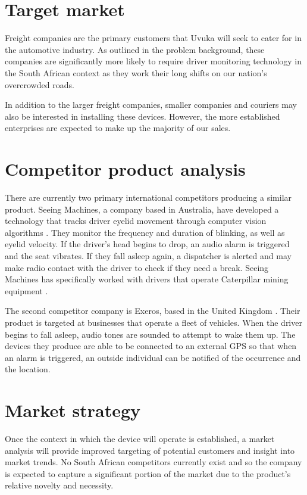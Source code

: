 \section{Target market}
Freight companies are the primary customers that Uvuka will seek to cater for in the automotive industry. As outlined in the problem background, these companies are significantly more likely to require driver monitoring technology in the South African context as they work their long shifts on our nation's overcrowded roads.

In addition to the larger freight companies, smaller companies and couriers may also be interested in installing these devices. However, the more established enterprises are expected to make up the majority of our sales.

\section{Competitor product analysis}
\label{sec:competitoranalysis}
There are currently two primary international competitors producing a similar product. Seeing Machines, a company based in Australia, have developed a technology that tracks driver eyelid movement through computer vision algorithms \cite{SeeingMachinesWebsite}. They monitor the frequency and duration of blinking, as well as eyelid velocity. If the driver’s head begins to drop, an audio alarm is triggered and the seat vibrates. If they fall asleep again, a dispatcher is alerted and may make radio contact with the driver to check if they need a break. Seeing Machines has specifically worked with drivers that operate Caterpillar mining equipment \cite{SeeingMachinesWired}.

The second competitor company is Exeros, based in the United Kingdom \cite{Exeros}. Their product is targeted at businesses that operate a fleet of vehicles. When the driver begins to fall asleep, audio tones are sounded to attempt to wake them up. The devices they produce are able to be connected to an external GPS so that when an alarm is triggered, an outside individual can be notified of the occurrence and the location.

\section{Market strategy}
Once the context in which the device will operate is established, a market analysis will provide improved targeting of potential customers and insight into market trends. No South African competitors currently exist and so the company is expected to capture a significant portion of the market due to the product’s relative novelty and necessity.

